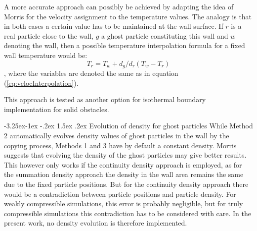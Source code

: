\documentclass{report}
\makeatletter
\renewcommand\paragraph{\@startsection{paragraph}{4}{\z@}%
  {-3.25ex\@plus -1ex \@minus -.2ex}%
  {1.5ex \@plus .2ex}%
  {\normalfont\normalsize\bfseries}}
\makeatother
\begin{document}
A more accurate approach can possibly be achieved by adapting the idea of Morris for the velocity assignment \cite{Morris1997, Zhu1999} to the temperature values. The analogy is that in both cases a certain value has to be maintained at the wall surface. If $r$ is a real particle close to the wall, $g$ a ghost particle constituting this wall and $w$ denoting the wall, then a possible temperature interpolation formula for a fixed wall temperature would be: %
\begin{equation}
 \label{eq:IsothermalBC_T_extrapolation}
T_r=T_w+d_g/d_r(T_w-T_r)
\end{equation}, where the variables are denoted the same as in equation (\ref{eq:velocInterpolation}).
 
This approach is tested as another option for isothermal boundary implementation for solid obstacles.


\paragraph{Evolution of density for ghost particles}
While Method 2 automatically evolves density values of ghost particles in the wall by the copying process, Methods 1 and 3 have by default a constant density. Morris \cite{Morris1997, Zhu1999} suggests that evolving the density of the ghost particles may give better results. This however only works if the continuity density approach is employed, as for the summation density approach the density in the wall area remains the same due to the fixed particle positions. But for the continuity density approach there would be a contradiction between particle positions and particle density. For weakly compressible simulations, this error is probably negligible, but for truly compressible simulations this contradiction has to be considered with care. In the present work, no density evolution is therefore implemented. 

\end{document}
